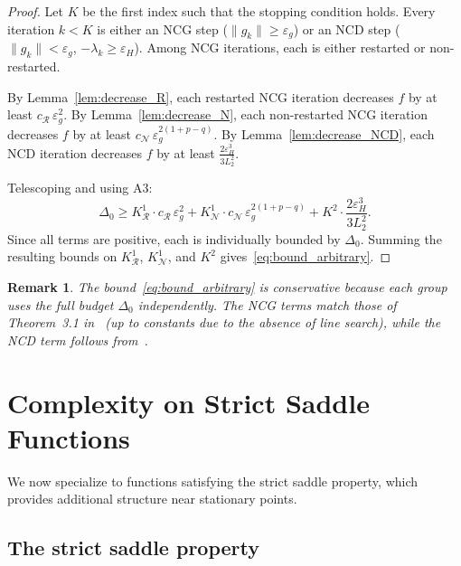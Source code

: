 \documentclass{article}
\newtheorem{remark}{Remark}
\begin{document}
\begin{proof}
Let $K$ be the first index such that the stopping condition holds. Every iteration $k < K$ is either an NCG step ($\|g_k\| \geq \varepsilon_g$) 
or an NCD step ($\|g_k\| < \varepsilon_g$, $-\lambda_k \geq \varepsilon_H$). Among NCG iterations, each is either restarted or non-restarted.

By Lemma~\ref{lem:decrease_R}, each restarted NCG iteration decreases $f$ by at least $c_{\mathcal{R}}\,\varepsilon_g^2$. 
By Lemma~\ref{lem:decrease_N}, each non-restarted NCG iteration decreases $f$ by at least $c_{\mathcal{N}}\,\varepsilon_g^{2(1+p-q)}$. By Lemma~\ref{lem:decrease_NCD}, each NCD iteration decreases $f$ by at least $\frac{2\varepsilon_H^3}{3L_2^2}$.

Telescoping and using A3:
\[
\Delta_0 \geq K^1_{\mathcal{R}} \cdot c_{\mathcal{R}}\,\varepsilon_g^2 + K^1_{\mathcal{N}} \cdot c_{\mathcal{N}}\,\varepsilon_g^{2(1+p-q)} + K^2 \cdot \frac{2\varepsilon_H^3}{3L_2^2}.
\]
Since all terms are positive, each is individually bounded by $\Delta_0$. Summing the resulting bounds on $K^1_{\mathcal{R}}$, $K^1_{\mathcal{N}}$, and $K^2$ gives~\eqref{eq:bound_arbitrary}.
\end{proof}

\begin{remark}
The bound~\eqref{eq:bound_arbitrary} is conservative because each group uses the full budget $\Delta_0$ independently. The NCG terms match those of Theorem~3.1 in~\cite{RoyerChan2022} (up to constants due to the absence of line search), while the NCD term follows from~\cite{WrightMa2022}.
\end{remark}


\section{Complexity on Strict Saddle Functions}
\label{sec:strict_saddle}

We now specialize to functions satisfying the strict saddle property, which provides additional structure near stationary points.

\subsection{The strict saddle property}
\end{document}
